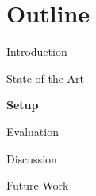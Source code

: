 \section{Outline}
\begin{frame}{}
    \vspace{1.5cm}
    \begin{itemize}
        \setlength\itemsep{2em}
        {\color{TUMBlack} 
            \item \large Introduction
            \item \large State-of-the-Art
        }
        \item \large \textbf{Setup}
        \item \large Evaluation
        \item \large Discussion
        \item \large Future Work
    \end{itemize}
\end{frame}